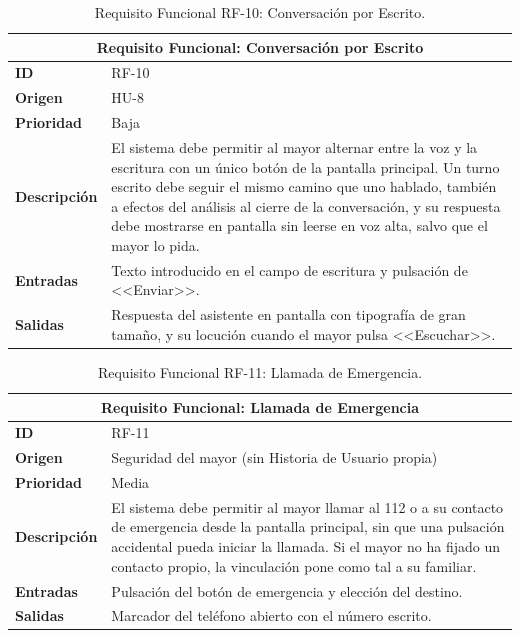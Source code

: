 \begin{table}[htbp]
    \centering
    \caption{Requisito Funcional RF-10: Conversación por Escrito.}
    \label{tab:rf10}
    \renewcommand{\arraystretch}{1.3}
    \begin{tabular}{|l|>{\raggedright\arraybackslash}p{}|}
        \hline
        \multicolumn{2}{|c|}{\textbf{Requisito Funcional: Conversación por Escrito}} \\
        \hline
        \textbf{ID} & RF-10 \\
        \hline
        \textbf{Origen} & HU-8 \\
        \hline
        \textbf{Prioridad} & Baja \\
        \hline
        \textbf{Descripción} & El sistema debe permitir al mayor alternar entre la voz y la escritura con un único botón de la pantalla principal. Un turno escrito debe seguir el mismo camino que uno hablado, también a efectos del análisis al cierre de la conversación, y su respuesta debe mostrarse en pantalla sin leerse en voz alta, salvo que el mayor lo pida. \\
        \hline
        \textbf{Entradas} & Texto introducido en el campo de escritura y pulsación de <<Enviar>>. \\
        \hline
        \textbf{Salidas} & Respuesta del asistente en pantalla con tipografía de gran tamaño, y su locución cuando el mayor pulsa <<Escuchar>>. \\
        \hline
    \end{tabular}

\end{table}

\begin{table}[htbp]
    \centering
    \caption{Requisito Funcional RF-11: Llamada de Emergencia.}
    \label{tab:rf11}
    \renewcommand{\arraystretch}{1.3}
    \begin{tabular}{|l|>{\raggedright\arraybackslash}p{}|}
        \hline
        \multicolumn{2}{|c|}{\textbf{Requisito Funcional: Llamada de Emergencia}} \\
        \hline
        \textbf{ID} & RF-11 \\
        \hline
        \textbf{Origen} & Seguridad del mayor (sin Historia de Usuario propia) \\
        \hline
        \textbf{Prioridad} & Media \\
        \hline
        \textbf{Descripción} & El sistema debe permitir al mayor llamar al 112 o a su contacto de emergencia desde la pantalla principal, sin que una pulsación accidental pueda iniciar la llamada. Si el mayor no ha fijado un contacto propio, la vinculación pone como tal a su familiar. \\
        \hline
        \textbf{Entradas} & Pulsación del botón de emergencia y elección del destino. \\
        \hline
        \textbf{Salidas} & Marcador del teléfono abierto con el número escrito. \\
        \hline
    \end{tabular}

\end{table}


